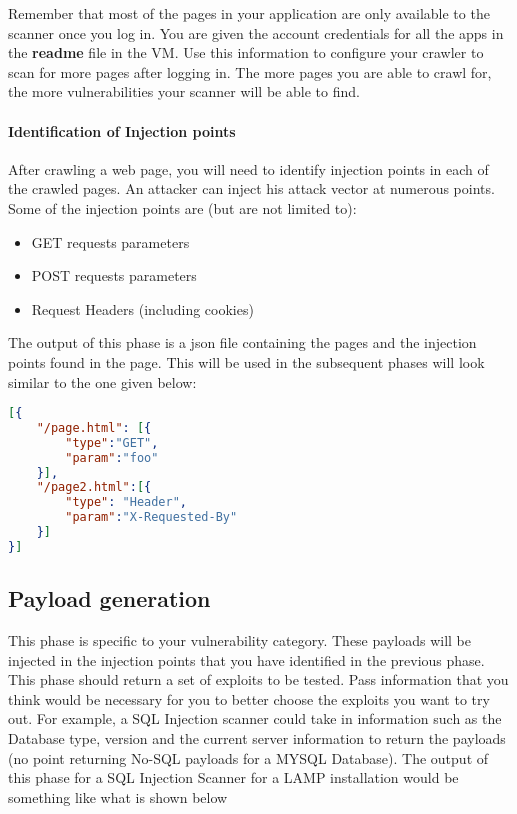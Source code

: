 \documentclass{article}[10pt]
\begin{document}
Remember that most of the pages in your application are only available to the scanner once you log in. You are given the account credentials for all the apps in the {\bf readme} file in the VM. Use this information to configure your crawler to scan for more pages after logging in. The more pages you are able to crawl for, the more vulnerabilities your scanner will be able to find.

\paragraph{Identification of Injection points}
After crawling a web page, you will need to identify injection points in each of the crawled pages. An attacker can inject his attack vector at numerous points. Some of the injection points are (but are not limited to):
	\begin{itemize}
	\item GET requests parameters
	\item POST requests parameters
	\item Request Headers (including cookies)
	\end{itemize}

The output of this phase is a json file containing the pages and the injection points found in the page.
This will be used in the subsequent phases will look similar to the one given below:
\begin{lstlisting}[language=json,firstnumber=1]
[{
	"/page.html": [{
		"type":"GET",
		"param":"foo"
	}],
	"/page2.html":[{
		"type": "Header",
		"param":"X-Requested-By"
	}]
}]
\end{lstlisting}

\subsection{Payload generation}
This phase is specific to your vulnerability category. These payloads will be injected in the injection points that you have identified in the previous phase. 
This phase should return a set of exploits to be tested. Pass information that you think would be necessary for you to better choose the exploits you want to try out. For example, a SQL Injection scanner could take in information such as the Database type, version and the current server information to return the payloads (no point returning No-SQL payloads for a MYSQL Database). The output of this phase for a SQL Injection Scanner for a LAMP installation would be something like what is shown below
\end{document}

